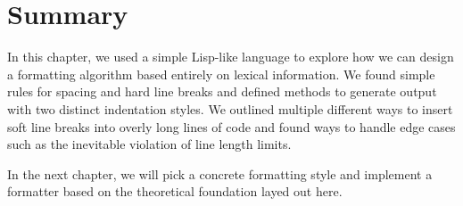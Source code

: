 \section{Summary}
In this chapter,
we used a simple Lisp-like language to explore
how we can design a formatting algorithm
based entirely on lexical information.
We found simple rules for
spacing and hard line breaks
and defined methods to generate output with
two distinct indentation styles.
We outlined multiple different ways
to insert soft line breaks
into overly long lines of code
and found ways to handle edge cases
such as the inevitable violation
of line length limits.

In the next chapter, we will pick
a concrete formatting style and
implement a formatter based on
the theoretical foundation layed out here.
